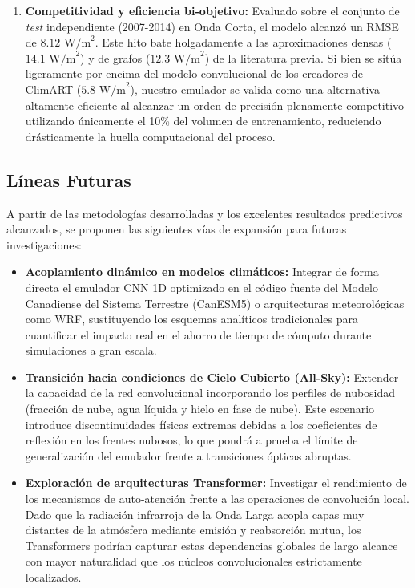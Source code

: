 \documentclass[11pt,a4paper,twoside,pdf]{article}
\numberwithin{equation}{section}
\begin{document}
\begin{enumerate}
    \item \textbf{Competitividad y eficiencia bi-objetivo:} Evaluado sobre el conjunto de \textit{test} independiente (2007-2014) en Onda Corta, el modelo alcanzó un RMSE de $8.12\text{ W/m}^2$. Este hito bate holgadamente a las aproximaciones densas ($14.1\text{ W/m}^2$) y de grafos ($12.3\text{ W/m}^2$) de la literatura previa. Si bien se sitúa ligeramente por encima del modelo convolucional de los creadores de ClimART ($5.8\text{ W/m}^2$), nuestro emulador se valida como una alternativa altamente eficiente al alcanzar un orden de precisión plenamente competitivo utilizando únicamente el 10\% del volumen de entrenamiento, reduciendo drásticamente la huella computacional del proceso.
\end{enumerate}

\subsection{Líneas Futuras}

A partir de las metodologías desarrolladas y los excelentes resultados predictivos alcanzados, se proponen las siguientes vías de expansión para futuras investigaciones:

\begin{itemize}
    \item \textbf{Acoplamiento dinámico en modelos climáticos:} Integrar de forma directa el emulador CNN 1D optimizado en el código fuente del Modelo Canadiense del Sistema Terrestre (CanESM5) o arquitecturas meteorológicas como WRF, sustituyendo los esquemas analíticos tradicionales para cuantificar el impacto real en el ahorro de tiempo de cómputo durante simulaciones a gran escala.
    
    \item \textbf{Transición hacia condiciones de Cielo Cubierto (All-Sky):} Extender la capacidad de la red convolucional incorporando los perfiles de nubosidad (fracción de nube, agua líquida y hielo en fase de nube). Este escenario introduce discontinuidades físicas extremas debidas a los coeficientes de reflexión en los frentes nubosos, lo que pondrá a prueba el límite de generalización del emulador frente a transiciones ópticas abruptas.
    
    \item \textbf{Exploración de arquitecturas Transformer:} Investigar el rendimiento de los mecanismos de auto-atención frente a las operaciones de convolución local. Dado que la radiación infrarroja de la Onda Larga acopla capas muy distantes de la atmósfera mediante emisión y reabsorción mutua, los Transformers podrían capturar estas dependencias globales de largo alcance con mayor naturalidad que los núcleos convolucionales estrictamente localizados.
\end{itemize}
\end{document}
